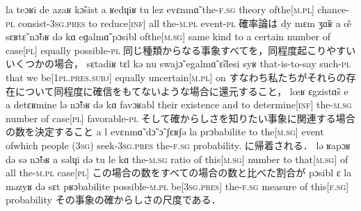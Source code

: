 \documentclass{ltjsarticle}
\newcommand\liaison{\hspace*{0.1em}\raisebox{-0.8ex}{\rotatebox{90}{(}}\hspace*{0.1em}}
\begin{document}
         {la teɔʁi de azaʁ {k\~{ɔ}sist\liaison} a ʁedɥiʁ tu {lez\liaison} evɛnm\~{ɑ}}
         {the-\textsc{f}.\textsc{sg} theory {of{\textunderscore}the[\textsc{m}.\textsc{pl}]} chance-\textsc{pl} consist-3\textsc{sg}.\textsc{pres} to {reduce[\textsc{inf}]} all the-\textsc{m}.\textsc{pl} event-\textsc{pl}}
         {確率論は}
         {dy mɛm {ʒ\~{ɑ}ʁ{\liaison}} a \~{œ} sɛʁt\~{ɛ} n\~{ɔ}bʁ də kɑ eɡalm\~{ɑ} pɔsibl}
         {{of{\textunderscore}the[\textsc{m}.\textsc{sg}]} same kind to a certain number of {case[\textsc{pl}]} equally possible-\textsc{pl}}
         {同じ種類からなる事象すべてを，同程度起こりやすいいくつかの場合，}
         {sɛtadiʁ tɛl kə nu swaj\~{ɔ} egalm\~{ɑ} \~{ɛ}desi syʁ}
         {that-is-to-say such-\textsc{pl} that we {be[1\textsc{pl}.\textsc{pres}.\textsc{subj}]} equally {uncertain[\textsc{m}.\textsc{pl}]} on}
         {すなわち私たちがそれらの存在について同程度に確信をもてないような場合に還元すること，}
         {{lœʁ\liaison} ɛgzist\~{ɑ}s e a detɛʁmine lə n\~{ɔ}bʁ də kɑ {favɔʁabl\liaison}}
         {their existence and to {determine[\textsc{inf}]} the-\textsc{m}.\textsc{sg} number of {case[\textsc{pl}]} favorable-\textsc{pl}}
         {そして確からしさを知りたい事象に関連する場合の数を決定すること}
         {a {l{\liaison}} evɛnm\~{ɑ} d\~{ɔ} \~{ɔ} ʃɛʁʃə la prɔbabilite}
         {to {the[\textsc{m}.\textsc{sg}]} event of{\textunderscore}which {people (3\textsc{sg})} seek-3\textsc{sg}.\textsc{pres} {the-\textsc{f}.\textsc{sg}} probability.}
         {に帰着される．}
         {lə ʁapɔʁ də sə {n\~{ɔ}bʁ{\liaison}} a səlɥi də tu le kɑ}
         {the-\textsc{m}.\textsc{sg} ratio of {this[\textsc{m}.\textsc{sg}]} number to {that[\textsc{m}.\textsc{sg}]} of all {the-\textsc{m}.\textsc{pl}} {case[\textsc{pl}]}}
         {この場合の数をすべての場合の数と比べた割合が}
         {{pɔsibl{\liaison}} ɛ la məzyʁ də sɛt pʁɔbabilite}
         {possible-\textsc{m}.\textsc{pl} {be[3\textsc{sg}.\textsc{pres}]} the-\textsc{f}.\textsc{sg} measure of {this[\textsc{f}.\textsc{sg}]} probability}
         {その事象の確からしさの尺度である．}
\end{document}
